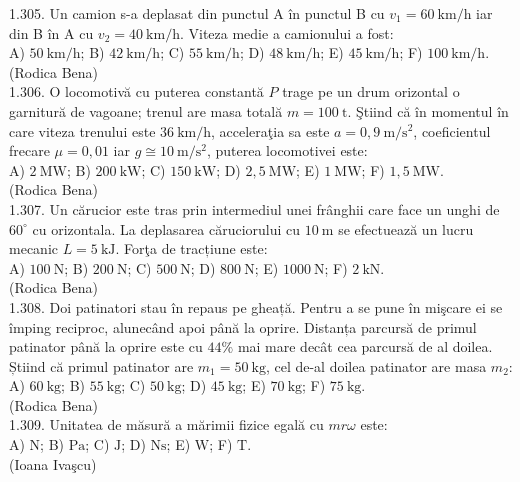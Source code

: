 1.305. Un camion s-a deplasat din punctul A în punctul B cu $v_{1}=60 \mathrm{~km} / \mathrm{h}$ iar din B în A cu $v_{2}=40 \mathrm{~km} / \mathrm{h}$. Viteza medie a camionului a fost:\\ A) $50 \mathrm{~km} / \mathrm{h}$; B) $42 \mathrm{~km} / \mathrm{h}$; C) $55 \mathrm{~km} / \mathrm{h}$; D) $48 \mathrm{~km} / \mathrm{h}$; E) $45 \mathrm{~km} / \mathrm{h}$; F) $100 \mathrm{~km} / \mathrm{h}$.\\ (Rodica Bena)\\

1.306. O locomotivă cu puterea constantă $P$ trage pe un drum orizontal o garnitură de vagoane; trenul are masa totală $m=100 \mathrm{~t}$. Ştiind că în momentul în care viteza trenului este $36 \mathrm{~km} / \mathrm{h}$, acceleraţia sa este $a=0,9 \mathrm{~m} / \mathrm{s}^{2}$, coeficientul frecare $\mu=0,01$ iar $g \cong 10 \mathrm{~m} / \mathrm{s}^{2}$, puterea locomotivei este:\\ A) $2 \mathrm{~MW}$; B) $200 \mathrm{~kW}$; C) $150 \mathrm{~kW}$; D) $2,5 \mathrm{~MW}$; E) $1 \mathrm{~MW}$; F) $1,5 \mathrm{~MW}$.\\ (Rodica Bena)\\

1.307. Un cărucior este tras prin intermediul unei frânghii care face un unghi de $60^{\circ}$ cu orizontala. La deplasarea căruciorului cu $10 \mathrm{~m}$ se efectuează un lucru mecanic $L=5 \mathrm{~kJ}$. Forţa de tracțiune este:\\ A) $100 \mathrm{~N}$; B) $200 \mathrm{~N}$; C) $500 \mathrm{~N}$; D) $800 \mathrm{~N}$; E) $1000 \mathrm{~N}$; F) $2 \mathrm{~kN}$.\\ (Rodica Bena)\\

1.308. Doi patinatori stau în repaus pe gheață. Pentru a se pune în mişcare ei se împing reciproc, alunecând apoi până la oprire. Distanța parcursă de primul patinator până la oprire este cu $44 \%$ mai mare decât cea parcursă de al doilea. Știind că primul patinator are $m_{1}=50 \mathrm{~kg}$, cel de-al doilea patinator are masa $m_{2}$:\\ A) $60 \mathrm{~kg}$; B) $55 \mathrm{~kg}$; C) $50 \mathrm{~kg}$; D) $45 \mathrm{~kg}$; E) $70 \mathrm{~kg}$; F) $75 \mathrm{~kg}$.\\ (Rodica Bena)\\

1.309. Unitatea de măsură a mărimii fizice egală cu $m r \omega$ este:\\ A) $\mathrm{N}$; B) $\mathrm{Pa}$; C) $\mathrm{J}$; D) $\mathrm{Ns}$; E) $\mathrm{W}$; F) $\mathrm{T}$.\\ (Ioana Ivaşcu)\\


